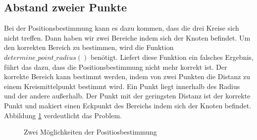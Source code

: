 \subsection{Abstand zweier Punkte}
Bei der Positionsbestimmung kann es dazu kommen, dass die drei Kreise sich nicht treffen. Dann haben wir zwei Bereiche indem sich der Knoten befindet. Um den korrekten Bereich zu bestimmen, wird die Funktion $determine\_point\_radius()$ benötigt. Liefert diese Funktion ein falsches Ergebnis, führt das dazu, dass die Positionsbestimmung nicht mehr korrekt ist. Der korrekte Bereich kann bestimmt werden, indem von zwei Punkten die Distanz zu einem Kreismittelpunkt bestimmt wird. Ein Punkt liegt innerhalb des Radius und der andere außerhalb. Der Punkt mit der geringsten Distanz ist der korrekte Punkt und makiert einen Eckpunkt des Bereichs indem sich der Knoten befindet. Abbildung \ref{img:figure_abstand_zweier_punkte} verdeutlicht das Problem.

\begin{figure}[H]
	\hspace*{-2.0cm}
	\caption{Zwei Möglichkeiten der Positiosbestimmung}
	\label{img:figure_abstand_zweier_punkte}
\end{figure}

